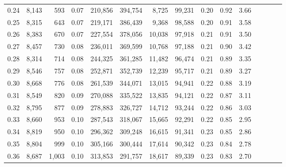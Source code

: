 \begin{tabular}{rrrcrrrrrrrrrrr}
0.24 &   8,143 &     593 &                                       0.07 &  210,856 &  394,754 &    8,725 &   99,231 &  0.20 &  0.92 &                         3.66 \\
0.25 &   8,315 &     643 &                                       0.07 &  219,171 &  386,439 &    9,368 &   98,588 &  0.20 &  0.91 &                         3.58 \\
0.26 &   8,383 &     670 &                                       0.07 &  227,554 &  378,056 &   10,038 &   97,918 &  0.21 &  0.91 &                         3.50 \\
0.27 &   8,457 &     730 &                                       0.08 &  236,011 &  369,599 &   10,768 &   97,188 &  0.21 &  0.90 &                         3.42 \\
0.28 &   8,314 &     714 &                                       0.08 &  244,325 &  361,285 &   11,482 &   96,474 &  0.21 &  0.89 &                         3.35 \\
0.29 &   8,546 &     757 &                                       0.08 &  252,871 &  352,739 &   12,239 &   95,717 &  0.21 &  0.89 &                         3.27 \\
0.30 &   8,668 &     776 &                                       0.08 &  261,539 &  344,071 &   13,015 &   94,941 &  0.22 &  0.88 &                         3.19 \\
0.31 &   8,549 &     820 &                                       0.09 &  270,088 &  335,522 &   13,835 &   94,121 &  0.22 &  0.87 &                         3.11 \\
0.32 &   8,795 &     877 &                                       0.09 &  278,883 &  326,727 &   14,712 &   93,244 &  0.22 &  0.86 &                         3.03 \\
0.33 &   8,660 &     953 &                                       0.10 &  287,543 &  318,067 &   15,665 &   92,291 &  0.22 &  0.85 &                         2.95 \\
0.34 &   8,819 &     950 &                                       0.10 &  296,362 &  309,248 &   16,615 &   91,341 &  0.23 &  0.85 &                         2.86 \\
0.35 &   8,804 &     999 &                                       0.10 &  305,166 &  300,444 &   17,614 &   90,342 &  0.23 &  0.84 &                         2.78 \\
0.36 &   8,687 &   1,003 &                                       0.10 &  313,853 &  291,757 &   18,617 &   89,339 &  0.23 &  0.83 &                         2.70 \\

\end{tabular}
